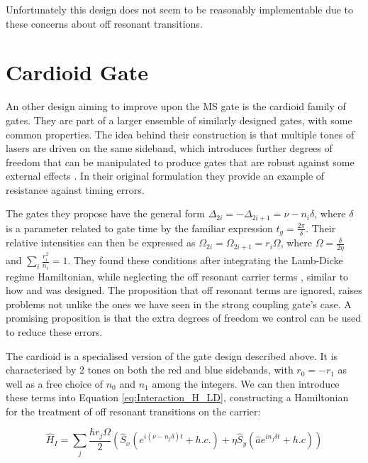 \documentclass[12pt,twoside]{report}
\begin{document}
Unfortunately this design does not seem to be reasonably implementable due to these concerns about off resonant transitions. 

\section{Cardioid Gate}
\label{Driving_schemes:Cardioid}

An other design aiming to improve upon the MS gate is the cardioid family of gates. They are part of a larger ensemble of similarly designed gates, with some common properties. The idea behind their construction is that multiple tones of lasers are driven on the same sideband, which introduces further degrees of freedom that can be manipulated to produce gates that are robust against some external effects \cite{Cardioid}. In their original formulation they provide an example of resistance against timing errors.

The gates they propose have the general form $\Delta_{2i} = -\Delta_{2i + 1} = \nu - n_i\delta$, where $\delta$ is a parameter related to gate time by the familiar expression $t_g = \frac{2\pi}{\delta}$. Their relative intensities can then be expressed as $\Omega_{2i} = \Omega_{2i + 1} = r_i\Omega$, where  $\Omega = \frac{\delta}{2\eta}$ and ${\sum_{i}\frac{r_i^2}{n_i} = 1}$. They found these conditions after integrating the Lamb-Dicke regime Hamiltonian, while neglecting the off resonant carrier terms \cite{Cardioid}, similar to how \cite{SC_Paper} and \cite{Fast_MS} was designed. The proposition that off resonant terms are ignored, raises problems not unlike the ones we have seen in the strong coupling gate's case. A promising proposition is that the extra degrees of freedom we control can be used to reduce these errors.

The cardioid is a specialised version of the gate design described above. It is characterised by 2 tones on both the red and blue sidebands, with $r_0 = -r_1$ as well as a free choice of $n_0$ and $n_1$ among the integers. We can then introduce these terms into Equation \eqref{eq:Interaction_H_LD}, constructing a Hamiltonian for the treatment of off resonant transitions on the carrier:

\begin{equation}
	\hat{H}_I = \sum_j \frac{\hbar r_j\Omega}{2}(\hat{S}_x (e^{i(\nu - n_j\delta)t} + h.c.) + \eta \hat{S}_y (\hat{a}e^{in_j\delta t} + h.c))
	\label{eq:Cardioid}
\end{equation}
\end{document}
